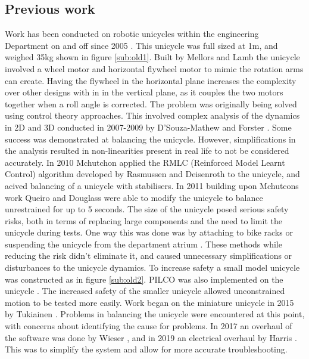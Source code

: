 \documentclass[twoside,twocolumn,12pt]{article}
\begin{document}
\subsection{Previous work}
Work has been conducted on robotic unicycles within the engineering Department on and off since 2005 \cite{original}. This unicycle was full sized at 1m, and weighed 35kg shown in figure \ref{sub:old1}. Built by Mellors and Lamb the unicycle involved a wheel motor and horizontal flywheel motor to mimic the rotation arms can create. Having the flywheel in the horizontal plane increases the complexity over other designs with in in the vertical plane, as it couples the two motors together when a roll angle is corrected.
\newline
The problem was originally being solved using control theory approaches. This involved complex analysis of the dynamics in 2D and 3D conducted in 2007-2009 by D'Souza-Mathew \cite{neil} and Forster  \cite{forster}. Some success was demonstrated at balancing the unicycle. However, simplifications in the analysis resulted in non-linearities present in real life to not be considered accurately.
\newline
In 2010 Mchutchon \cite{mchut} applied the RMLC (Reinforced Model Learnt Control) algorithm developed by Rasmussen and Deisenroth to the unicycle, and acived balancing of a unicycle with stabilisers. In 2011 building upon Mchutcons work Queiro \cite{roderigo} and Douglass \cite{douglass} were able to modify the unicycle to balance unrestrained for up to 5 seconds. 
\newline
The size of the unicycle posed serious safety risks, both in terms of replacing large components and the need to limit the unicycle during tests. One way this was done was by attaching to bike racks \cite{neil} or suspending the unicycle from the department atrium \cite{roderigo}. These methods while reducing the risk didn't eliminate it, and caused unnecessary simplifications or disturbances to the unicycle dynamics. 
\newline
To increase safety a small model unicycle was constructed as in figure \ref{sub:old2}. PILCO was also implemented on the unicycle \cite{pilco}. The increased safety of the smaller unicycle allowed unconstrained motion to be tested more easily. Work began on the miniature unicycle in 2015 by Tukiainen \cite{tuk}. Problems in balancing the unicycle were encountered at this point, with concerns about identifying the cause for problems. In 2017 an overhaul of the software was done by Wieser \cite{eric}, and in 2019 an electrical overhaul by Harris \cite{arsalan}. This was to simplify the system and allow for more accurate troubleshooting. 
\end{document}
